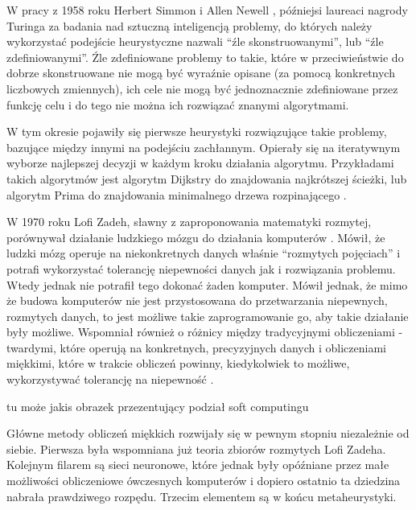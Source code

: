 \documentclass[twoside]{iisthesis}
\begin{document}
W pracy z 1958 roku Herbert Simmon i Allen Newell \cite{simon1958heuristic}, późniejsi laureaci nagrody Turinga za badania nad sztuczną inteligencją problemy, do których należy wykorzystać podejście heurystyczne nazwali ``źle skonstruowanymi'', lub ``źle zdefiniowanymi''. Źle zdefiniowane problemy to takie, które w przeciwieństwie do dobrze skonstruowane nie mogą być wyraźnie opisane (za pomocą konkretnych liczbowych zmiennych), ich cele nie mogą być jednoznacznie zdefiniowane przez funkcję celu i do tego nie można ich rozwiązać znanymi algorytmami. 

W tym okresie pojawiły się pierwsze heurystyki rozwiązujące takie problemy, bazujące między innymi na podejściu zachłannym. Opierały się na iteratywnym wyborze najlepszej decyzji w każdym kroku działania algorytmu. Przykładami takich algorytmów jest algorytm Dijkstry do znajdowania najkrótszej ścieżki, lub algorytm Prima do znajdowania minimalnego drzewa rozpinającego \cite{Cormen:2001:IA:580470}. 

W 1970 roku Lofi Zadeh, sławny z zaproponowania matematyki rozmytej, porównywał działanie ludzkiego mózgu do działania komputerów \cite{proc-zadeh}. Mówił, że ludzki mózg operuje na niekonkretnych danych właśnie ``rozmytych pojęciach'' i potrafi wykorzystać tolerancję niepewności danych jak i rozwiązania problemu. Wtedy jednak nie potrafił tego dokonać żaden komputer. Mówił jednak, że mimo że budowa komputerów nie jest przystosowana do przetwarzania niepewnych, rozmytych danych, to jest możliwe takie zaprogramowanie go, aby takie działanie były możliwe. Wspomniał również o różnicy między tradycyjnymi obliczeniami - twardymi, które operują na konkretnych, precyzyjnych danych i obliczeniami miękkimi, które w trakcie obliczeń powinny, kiedykolwiek to możliwe, wykorzystywać tolerancję na niepewność \cite{history-soft}. 

tu może jakis obrazek przezentujący podział soft computingu 

Główne metody obliczeń miękkich rozwijały się w pewnym stopniu niezależnie od siebie. Pierwsza była wspomniana już teoria zbiorów rozmytych Lofi Zadeha. Kolejnym filarem są sieci neuronowe, które jednak były opóźniane przez małe możliwości obliczeniowe ówczesnych komputerów i dopiero ostatnio ta dziedzina nabrała prawdziwego rozpędu. Trzecim elementem są w końcu metaheurystyki.
\end{document}
